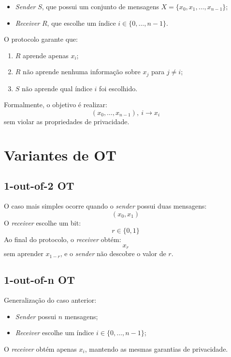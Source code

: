 \documentclass[12pt, oneside, a4paper, english, brazil]{abntex2}
\begin{document}
\begin{itemize}
\item \emph{Sender} $S$, que possui um conjunto de mensagens
$X = \{x_0, x_1, \ldots, x_{n-1}\}$;
\item \emph{Receiver} $R$, que escolhe um índice $i \in \{0, \ldots, n-1\}$.
\end{itemize}

O protocolo garante que:

\begin{enumerate}
\item $R$ aprende apenas $x_i$;
\item $R$ não aprende nenhuma informação sobre $x_j$ para $j \neq i$;
\item $S$ não aprende qual índice $i$ foi escolhido.
\end{enumerate}

Formalmente, o objetivo é realizar:
\[
(x_0, \ldots, x_{n-1}),\ i \longrightarrow x_i
\]
sem violar as propriedades de privacidade.

\section{Variantes de OT}

\subsection{1-out-of-2 OT}

O caso mais simples ocorre quando o \emph{sender} possui duas mensagens:
\[
(x_0, x_1)
\]
O \emph{receiver} escolhe um bit:
\[
r \in \{0, 1\}
\]
Ao final do protocolo, o \emph{receiver} obtém:
\[
x_r
\]
sem aprender $x_{1-r}$, e o \emph{sender} não descobre o valor de $r$.

\subsection{1-out-of-n OT}

Generalização do caso anterior:

\begin{itemize}
\item \emph{Sender} possui $n$ mensagens;
\item \emph{Receiver} escolhe um índice $i \in \{0, \ldots, n-1\}$;
\end{itemize}

O \emph{receiver} obtém apenas $x_i$, mantendo as mesmas garantias de
privacidade.
\end{document}
